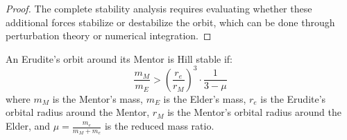 \begin{proof}
The complete stability analysis requires evaluating whether these additional forces stabilize or destabilize the orbit, which can be done through perturbation theory or numerical integration.
\end{proof}

\begin{theorem}
An Erudite's orbit around its Mentor is Hill stable if:
\begin{equation}
\frac{m_M}{m_E} > \left(\frac{r_e}{r_M}\right)^3 \cdot \frac{1}{3 - \mu}
\end{equation}
where $m_M$ is the Mentor's mass, $m_E$ is the Elder's mass, $r_e$ is the Erudite's orbital radius around the Mentor, $r_M$ is the Mentor's orbital radius around the Elder, and $\mu = \frac{m_e}{m_M + m_e}$ is the reduced mass ratio.
\end{theorem}

